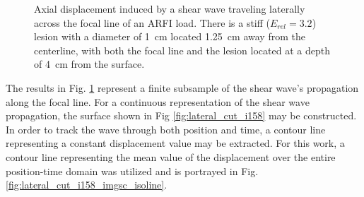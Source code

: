 			\begin{figure}[!t]
				\centering
				\caption[Sample shear wave motion through time]{Axial displacement induced by a shear wave traveling laterally across the focal line of an ARFI load. There is a stiff ($E_{rel} = 3.2$) lesion with a diameter of \SI{1}{\cm} located \SI{1.25}{\cm} away from the centerline, with both the focal line and the lesion located at a depth of \SI{4}{\cm} from the surface.}
				\label{fig:lateral_wave_i158}
			\end{figure}

			The results in Fig. \ref{fig:lateral_wave_i158} represent a finite subsample of the shear wave's propagation along the focal line. For a continuous representation of the shear wave propagation, the surface shown in Fig \ref{fig:lateral_cut_i158} may be constructed. In order to track the wave through both position and time, a contour line representing a constant displacement value may be extracted. For this work, a contour line representing the mean value of the displacement over the entire position-time domain was utilized and is portrayed in Fig. \ref{fig:lateral_cut_i158_imgsc_isoline}.

